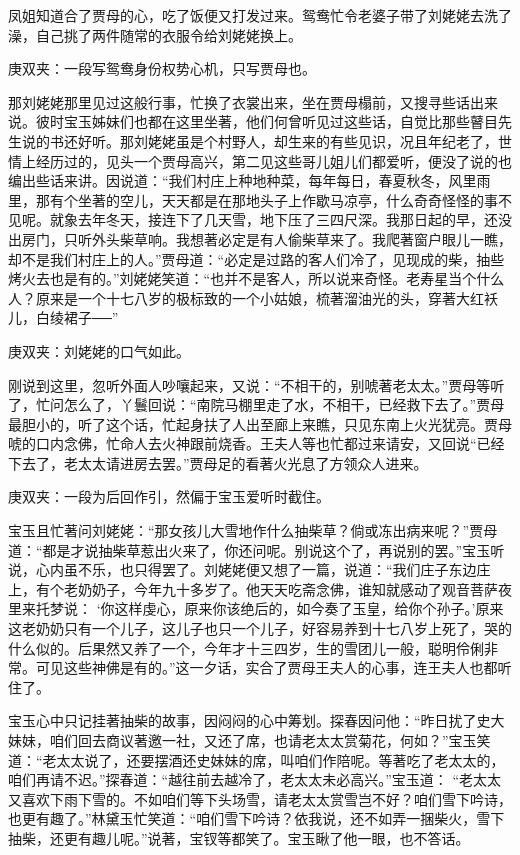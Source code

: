 \begin{parag}
    凤姐知道合了贾母的心，吃了饭便又打发过来。鸳鸯忙令老婆子带了刘姥姥去洗了澡，自己挑了两件随常的衣服令给刘姥姥换上。\begin{note}庚双夹：一段写鸳鸯身份权势心机，只写贾母也。\end{note}那刘姥姥那里见过这般行事，忙换了衣裳出来，坐在贾母榻前，又搜寻些话出来说。彼时宝玉姊妹们也都在这里坐著，他们何曾听见过这些话，自觉比那些瞽目先生说的书还好听。那刘姥姥虽是个村野人，却生来的有些见识，况且年纪老了，世情上经历过的，见头一个贾母高兴，第二见这些哥儿姐儿们都爱听，便没了说的也编出些话来讲。因说道：“我们村庄上种地种菜，每年每日，春夏秋冬，风里雨里，那有个坐著的空儿，天天都是在那地头子上作歇马凉亭，什么奇奇怪怪的事不见呢。就象去年冬天，接连下了几天雪，地下压了三四尺深。我那日起的早，还没出房门，只听外头柴草响。我想著必定是有人偷柴草来了。我爬著窗户眼儿一瞧，却不是我们村庄上的人。”贾母道：“必定是过路的客人们冷了，见现成的柴，抽些烤火去也是有的。”刘姥姥笑道：“也并不是客人，所以说来奇怪。老寿星当个什么人？原来是一个十七八岁的极标致的一个小姑娘，梳著溜油光的头，穿著大红袄儿，白绫裙子──”\begin{note}庚双夹：刘姥姥的口气如此。\end{note}刚说到这里，忽听外面人吵嚷起来，又说：“不相干的，别唬著老太太。”贾母等听了，忙问怎么了，丫鬟回说：“南院马棚里走了水，不相干，已经救下去了。”贾母最胆小的，听了这个话，忙起身扶了人出至廊上来瞧，只见东南上火光犹亮。贾母唬的口内念佛，忙命人去火神跟前烧香。王夫人等也忙都过来请安，又回说“已经下去了，老太太请进房去罢。”贾母足的看著火光息了方领众人进来。\begin{note}庚双夹：一段为后回作引，然偏于宝玉爱听时截住。\end{note}宝玉且忙著问刘姥姥：“那女孩儿大雪地作什么抽柴草？倘或冻出病来呢？”贾母道：“都是才说抽柴草惹出火来了，你还问呢。别说这个了，再说别的罢。”宝玉听说，心内虽不乐，也只得罢了。刘姥姥便又想了一篇，说道：“我们庄子东边庄上，有个老奶奶子，今年九十多岁了。他天天吃斋念佛，谁知就感动了观音菩萨夜里来托梦说： ‘你这样虔心，原来你该绝后的，如今奏了玉皇，给你个孙子。’原来这老奶奶只有一个儿子，这儿子也只一个儿子，好容易养到十七八岁上死了，哭的什么似的。后果然又养了一个，今年才十三四岁，生的雪团儿一般，聪明伶俐非常。可见这些神佛是有的。”这一夕话，实合了贾母王夫人的心事，连王夫人也都听住了。
\end{parag}


\begin{parag}
    宝玉心中只记挂著抽柴的故事，因闷闷的心中筹划。探春因问他：“昨日扰了史大妹妹，咱们回去商议著邀一社，又还了席，也请老太太赏菊花，何如？”宝玉笑道：“老太太说了，还要摆酒还史妹妹的席，叫咱们作陪呢。等著吃了老太太的，咱们再请不迟。”探春道：“越往前去越冷了，老太太未必高兴。”宝玉道： “老太太又喜欢下雨下雪的。不如咱们等下头场雪，请老太太赏雪岂不好？咱们雪下吟诗，也更有趣了。”林黛玉忙笑道：“咱们雪下吟诗？依我说，还不如弄一捆柴火，雪下抽柴，还更有趣儿呢。”说著，宝钗等都笑了。宝玉瞅了他一眼，也不答话。
\end{parag}


